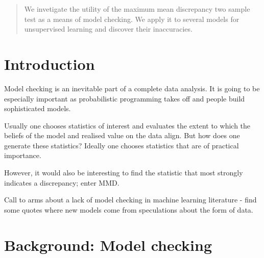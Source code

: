 \documentclass{article}
\begin{document}
 


\begin{abstract} 
We invetigate the utility of the maximum mean discrepancy two sample test as a means of model checking.
We apply it to several models for unsupervised learning and discover their inaccuracies.
\end{abstract} 

\allowdisplaybreaks

\section{Introduction}

Model checking is an inevitable part of a complete data analysis.
It is going to be especially important as probabilistic programming takes off and people build sophisticated models.

Usually one chooses statistics of interest and evaluates the extent to which the beliefs of the model and realised value on the data align.
But how does one generate these statistics?
Ideally one chooses statistics that are of practical importance.

However, it would also be interesting to find the statistic that most strongly indicates a discrepancy; enter MMD.

Call to arms about a lack of model checking in machine learning literature - find some quotes where new models come from speculations about the form of data.

\section{Background: Model checking}
\end{document}
